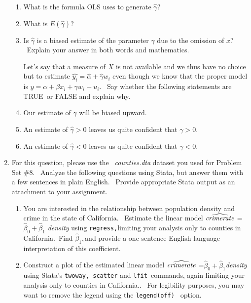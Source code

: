 \documentclass[11pt]{article}
\begin{document}
\begin{enumerate}
\begin{enumerate}
\item What is the formula OLS uses to generate $\widehat{\gamma }$? $\ $

\item What is $E\left( \widehat{\gamma }\right) $?

\item Is $\widehat{\gamma }$ is a biased estimate of the parameter $\gamma $
due to the omission of $x$? \ Explain your answer in both words and
mathematics. \bigskip \bigskip 

Let's say that a measure of $X$ is not available and we thus have no choice
but to estimate $\widehat{y_{i}}=\widehat{\alpha }+\widehat{\gamma }w_{i}$
even though we know that the proper model is $y=\alpha +\beta x_{i}+\gamma
w_{i}+u_{i}.$ \ Say whether the following statements are TRUE\ or FALSE and
explain why.\bigskip

\item Our estimate of $\gamma $ will be biased upward.

\item An estimate of $\widehat{\gamma }>0$ leaves us quite confident that $%
\gamma >0.$

\item An estimate of $\widehat{\gamma }<0$ leaves us quite confident that $%
\gamma <0.$\bigskip
\end{enumerate}

\item For this question, please use the \textit{\ counties.dta} dataset you
used for Problem Set \#8. \ Analyze the following questions using Stata, but
answer them with a few sentences in plain English. \ Provide appropriate
Stata output as an attachment to your assignment.\bigskip 

\begin{enumerate}
\item You are interested in the relationship between population density and
crime in the state of California. \ Estimate the linear model $\widehat{%
\mathit{crimerate}}$ =$\widehat{\beta }_{0}+\widehat{\beta }_{1}$\textit{%
density} using \texttt{regress,}limiting your analysis only to counties in
California.\texttt{\ }Find $\widehat{\beta }_{1},$and provide a one-sentence
English-language interpretation of this coefficient.

\item Construct a plot of the estimated linear model $\widehat{\mathit{%
crimerate}}$ =$\widehat{\beta }_{0}+\widehat{\beta }_{1}$\textit{density}
using Stata's \texttt{twoway, scatter} and \texttt{lfit }commands, again
limiting your analysis only to counties in California.. \ For legibility
purposes, you may want to remove the legend using the \texttt{legend(off) }%
option.


\end{enumerate}
\end{enumerate}
\end{document}
